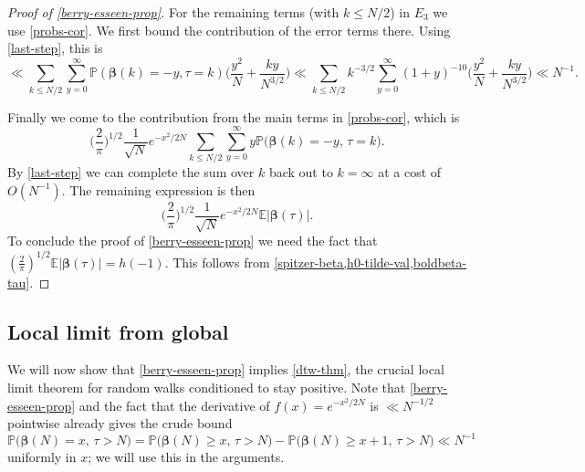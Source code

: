 \documentclass[11pt,reqno]{amsart}
\numberwithin{equation}{section}
\theoremstyle{definition}
\theoremstyle{remark}
\newcommand{\mb}{\mathbb}
\def\boldbeta{\boldsymbol\beta}
\renewcommand{\le}{\leqslant}
\renewcommand{\ge}{\geqslant}
\begin{document}
\begin{proof}[Proof of \cref{berry-esseen-prop}]
For the remaining terms (with $k \le N/2$) in $E_3$ we use \cref{probs-cor}. We first bound the contribution of the error terms there. Using \cref{last-step}, this is 
\[ \ll \sum_{k \le N/2} \sum_{y = 0}^{\infty} \mb{P}(\boldbeta(k) = -y, \tau = k) \big( \frac{y^2}{N} + \frac{ky}{N^{3/2}}\big)\ll \sum_{k \le N/2}  k^{-3/2}  \sum_{y = 0}^{\infty} (1 + y)^{-10} \big( \frac{y^2}{N} + \frac{ky}{N^{3/2}}\big) \ll N^{-1} .\] 

Finally we come to the contribution from the main terms in \cref{probs-cor}, which is 
\[ \big(\frac{2}{\pi}\big)^{1/2}\frac{1}{\sqrt{N}} e^{-x^2/2N} \sum_{k \le N/2} \sum_{y = 0}^{\infty} y\mb{P}\big(\boldbeta(k) = -y,\, \tau = k\big) . \]
By \cref{last-step} we can complete the sum over $k$ back out to $k = \infty$ at a cost of $O(N^{-1})$. The remaining expression is then 
\[ \big(\frac{2}{\pi}\big)^{1/2} \frac{1}{\sqrt{N}} e^{-x^2/2N} \mb{E} |\boldbeta(\tau)|.\]
To conclude the proof of \cref{berry-esseen-prop} we need the fact that $(\frac{2}{\pi})^{1/2} \mb{E} |\boldbeta(\tau)| = h(-1)$. This follows from \cref{spitzer-beta,h0-tilde-val,boldbeta-tau}.\end{proof}


\subsection{Local limit from global}



We will now show that \cref{berry-esseen-prop} implies \cref{dtw-thm}, the crucial local limit theorem for random walks conditioned to stay positive. Note that \cref{berry-esseen-prop} and the fact that the derivative of $f(x) = e^{-x^2/2N}$ is $\ll N^{-1/2}$ pointwise already gives the crude bound
\begin{equation}\label{crude-local}  \mb{P}\big(\boldbeta(N) = x,\, \tau > N) = \mb{P}\big(\boldbeta(N) \ge x,\, \tau > N) - \mb{P}\big(\boldbeta(N) \ge x+1,\, \tau > N) \ll N^{-1}\end{equation}
uniformly in $x$; we will use this in the arguments.
\end{document}
